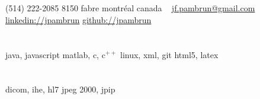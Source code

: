 \documentclass[print]{friggeri-cv}
\begin{document}

\newcommand{\eletr}{\href{http://www.etsmtl.ca/Programmes-Etudes/1er-cycle/Fiche-de-cours?Sigle=ELE747}{ele{\footnotesize747}}}
\newcommand{\eleenv}{\href{http://www.etsmtl.ca/Programmes-Etudes/1er-cycle/Fiche-de-cours?Sigle=ELE116}{ele{\footnotesize116}}}
\newcommand{\gtssys}{\href{http://www.etsmtl.ca/Futurs-etudiants/Cycles-sup/Fiche-de-cours?Sigle=GTS840}{gts{\footnotesize840}}}

\begin{aside}
  \section{}
  {\small(514) 222-2085}
  {\small8150} fabre
  montréal
  canada
  ~
  \href{mailto:jf.pambrun@gmail.com}{jf.pambrun@gmail.com}
  \href{https://ca.linkedin.com/in/jpambrun}{linkedin://jpambrun}
  \href{http://github.com/jpambrun}{github://jpambrun}
  \section{}
  \section{}
  java, javascript
  matlab, c, c{\tiny$^{++}$}
  linux, xml, git
  html{\small5}, latex
  \section{}
  dicom, ihe, hl{\small7}
  jpeg {\small2000}, jpip
\end{aside}

\begin{cvfootnote}
\end{cvfootnote}
\end{document}
